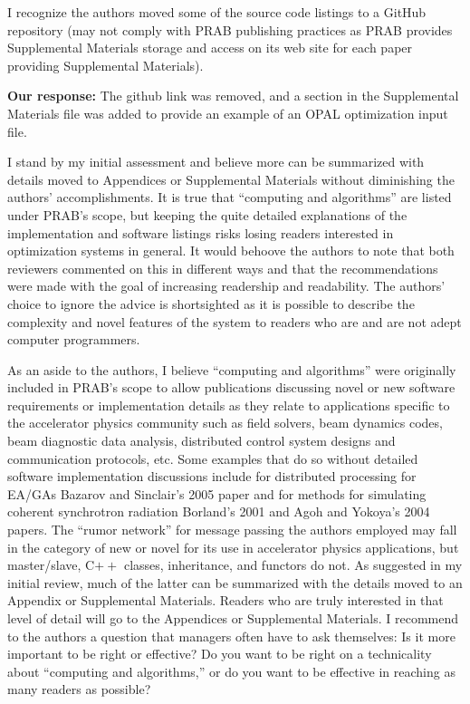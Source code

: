 \documentclass{article}
\begin{document}
I recognize the authors moved some of the source code listings to a
GitHub repository (may not comply with PRAB publishing practices as
PRAB provides Supplemental Materials storage and access on its web
site for each paper providing Supplemental Materials). 

{\bf Our response:} {\color{blue} The github link was removed,
	and a section in the Supplemental Materials file
	was added to provide an example of an OPAL optimization input file.}

I stand by my initial assessment and believe more can be summarized with details
moved to Appendices or Supplemental Materials without diminishing the
authors' accomplishments. It is true that ``computing and algorithms''
are listed under PRAB's scope, but keeping the quite detailed
explanations of the implementation and software listings risks losing
readers interested in optimization systems in general. It would
behoove the authors to note that both reviewers commented on this in
different ways and that the recommendations were made with the goal of
increasing readership and readability. The authors' choice to ignore
the advice is shortsighted as it is possible to describe the
complexity and novel features of the system to readers who are and are
not adept computer programmers.

As an aside to the authors, I believe ``computing and algorithms''
were originally included in PRAB's scope to allow publications
discussing novel or new software requirements or
implementation details as they relate to applications specific to the
accelerator physics community such as field solvers, beam dynamics
codes, beam diagnostic data analysis, distributed control system
designs and communication protocols, etc. Some examples that do so
without detailed software implementation discussions include for
distributed processing for EA/GAs Bazarov and Sinclair's 2005 paper
and for methods for simulating coherent synchrotron radiation
Borland's 2001 and Agoh and Yokoya's 2004 papers. The ``rumor
network'' for message passing the authors employed may fall in the
category of new or novel for its use in accelerator physics
applications, but master/slave, C$++$ classes, inheritance, and
functors do not. As suggested in my initial review, much of the latter
can be summarized with the details moved to an Appendix or
Supplemental Materials. Readers who are truly interested in that level
of detail will go to the Appendices or Supplemental Materials. I
recommend to the authors a question that managers often have to ask
themselves: Is it more important to be right or effective? Do you want
to be right on a technicality about ``computing and algorithms,'' or
do you want to be effective in reaching as many readers as possible?
\end{document}
